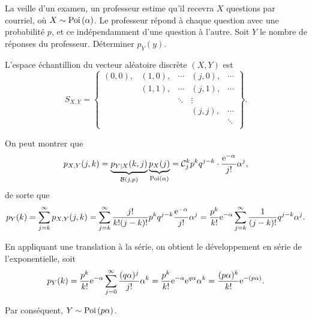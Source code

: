 \documentclass[11pt]{article}
\newcommand\comb[2]{%
	\ensuremath{%
		\mathcal{C}_{#2}^{#1}%
	}%
}%
\newcommand\e{%
	\ensuremath{%
		\mathrm{e}%
	}%
}%
\newcommand\Bin[2]{%
	\ensuremath{%
		\mathcal{B}\left(#1,#2\right)%
	}%
}%
\newcommand\Poi[1]{%
	\ensuremath{%
		\mathrm{Poi}\left(#1\right)%
	}%
}%
\theoremstyle{remark}
\theoremstyle{definition}
\begin{document}
\begin{exemple}
	La veille d'un examen, un professeur estime qu'il recevra $X$ questions par
	courriel, où $X\sim\Poi{\alpha}$. Le professeur répond à chaque question
	avec une probabilité $p$, et ce indépendamment d'une question à l'autre.
	Soit $Y$ le nombre de réponses du professeur. Déterminer $p_Y(y)$.

	L'espace échantillion du vecteur aléatoire discrète $(X,Y)$ est
	\begin{equation*}
		S_{X,Y}=\left\{
			\begin{matrix}
				(0,0), & (1,0), & \cdots & (j,0), & \cdots\\
				       & (1,1), & \cdots & (j,1), & \cdots\\
				       &        & \ddots & \vdots &       \\
				       &        &        & (j,j), & \cdots\\
					   &        &        &        & \ddots\\
			\end{matrix}
		\right\}.
	\end{equation*}
\end{exemple}
\addtocounter{exemple}{-1}
\begin{exemple}[suite]
	On peut montrer que
	\begin{equation*}
		p_{X,Y}(j,k)
		=\underbrace{p_{Y|X}(k,j)}_{\Bin{j}{p}}
		 \underbrace{p_X(j)}_{\Poi{\alpha}}
		=\comb{k}{j}p^kq^{j-k}\cdot\frac{\e^{-\alpha}}{j!}\alpha^j,
	\end{equation*}
	de sorte que
	\begin{equation*}
		p_Y(k)
		=\sum_{j=k}^\infty p_{X,Y}(j,k)
		=\sum_{j=k}^\infty\frac{j!}{k!(j-k)!}p^kq^{j-k}\frac{\e^{-\alpha}}{j!}
			\alpha^j
		=\frac{p^k}{k!}\e^{-\alpha}\sum_{j=k}^\infty\frac{1}{(j-k)!}q^{j-k}
			\alpha^j.
	\end{equation*}
\end{exemple}
\addtocounter{exemple}{-1}
\begin{exemple}[suite]
	En appliquant une translation à la série, on obtient le développement en
	série de l'exponentielle, soit
	\begin{equation*}
		p_Y(k)
		=\frac{p^k}{k!}\e^{-\alpha}\sum_{j=0}^\infty\frac{(q\alpha)^j}{j!}
			\alpha^k
		=\frac{p^k}{k!}\e^{-\alpha}\e^{q\alpha}\alpha^k
		=\frac{(p\alpha)^k}{k!}\e^{-(p\alpha)}.
	\end{equation*}

	Par conséquent, $Y\sim\Poi{p\alpha}$.
\end{exemple}
\end{document}
